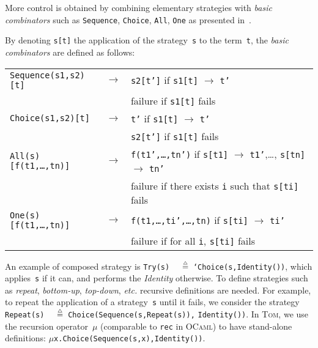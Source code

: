 \documentclass[runningheads]{llncs}
\newcommand{\tom}{\textsc{Tom}}
\newcommand{\ocaml}{\textsc{OCaml}}
\newcommand{\isdef}{\mathrel{\mbox{\small$\stackrel{\mbox{\tiny$\triangle$}}{=}$}}}
\newcommand{\Mu}{{\ensuremath{\mu}}}
\newcommand{\etc}{\textit{etc.}}
\begin{document}
More control is obtained by combining elementary strategies with \emph{basic
combinators} such as \texttt{Sequence}, \texttt{Choice},
\texttt{All}, \texttt{One} as presented
in~\cite{BKK98,visser-icfp98}.

By denoting \texttt{s[t]} the application of the strategy~\texttt{s} to the
term~\texttt{t}, the \emph{basic combinators} are defined as follows:

\begin{small}
\begin{tabular}{lll}

\texttt{Sequence(s1,s2)[t]} & $\rightarrow$ & \texttt{s2[t']} if \texttt{s1[t]}
$\rightarrow$ \texttt{t'}\\
&& failure if \texttt{s1[t]} fails\\

\texttt{Choice(s1,s2)[t]} & $\rightarrow$ & \texttt{t'} if \texttt{s1[t]}
$\rightarrow$ \texttt{t'}\\
&& \texttt{s2[t']} if \texttt{s1[t]} fails\\

\texttt{All(s)[f(t1,\ldots,tn)]} & $\rightarrow$ & \texttt{f(t1',\ldots,tn')}
if \texttt{s[t1]} $\rightarrow$ \texttt{t1'},\ldots, \texttt{s[tn]}
$\rightarrow$ \texttt{tn'}\\
&& failure if there exists \texttt{i} such that \texttt{s[ti]} fails\\

\texttt{One(s)[f(t1,\ldots,tn)]} & $\rightarrow$ &
\texttt{f(t1,\ldots,ti',\ldots,tn)} if \texttt{s[ti]}  $\rightarrow$
\texttt{ti'}\\
&& failure if for all \texttt{i}, \texttt{s[ti]} fails\\
\end{tabular}
\end{small}

An example of composed strategy is
\texttt{Try(s)}~${\isdef}$~\texttt{`Choice(s,Identity())},
which applies~\texttt{s} if it can, and performs the \textit{Identity} otherwise.
To define strategies such as \emph{repeat}, \emph{bottom-up}, \emph{top-down},
{\etc} recursive definitions are needed. For example, to repeat the application
of a strategy~\texttt{s} until it fails, we consider the strategy
\texttt{Repeat(s)}~${\isdef}$~\texttt{Choice(Sequence(s,Repeat(s)),}
\texttt{Identity())}.  In {\tom}, we use the recursion operator~$\Mu$
(comparable to \texttt{rec} in {\ocaml}) to have stand-alone definitions:
$\Mu$\texttt{x.Choice(Sequence(s,x),Identity())}.
\end{document}
